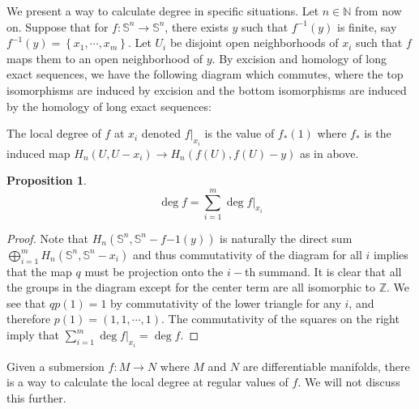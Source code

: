 \documentclass[12pt,reqno]{amsart}
\numberwithin{theorem}{section}
\theoremstyle{definition}
\theoremstyle{remark}
\numberwithin{equation}{section}
\newcommand{\Z}{\mathbb Z}
\newcommand{\N}{\mathbb N}
\renewcommand{\S}{\mathbb S}
\newcommand{\set}[1]{\left \{ #1 \right \}}
\theoremstyle{definition}
\newtheorem{prop}[theorem]{Proposition}
\begin{document}
We present a way to calculate degree in specific situations. Let $n \in \N$ from now on. Suppose that for $f:\S^n\rightarrow \S^n$, there exists $y $ such that $f^{-1}(y)$ is finite, say $f^{-1}(y)=\set{x_1,\cdots,x_m}$. Let $U_i$ be disjoint open neighborhoods of $x_i$ such that $f$ maps them to an open neighborhood of $y$. By excision and homology of long exact sequences, we have the following diagram which commutes, where the top isomorphisms are induced by excision and the bottom isomorphisms are induced by the homology of long exact sequences:
\begin{center}
\end{center}
\begin{definition}
    The local degree of $f$ at $x_i$ denoted $f|_{x_i} $ is the value of $f_*(1)$ where $f_*$ is the induced map $H_n(U,U-x_i)\rightarrow H_n(f(U),f(U)-y)$ as in above.
\end{definition}
\begin{prop}
    $$\deg f = \sum_{i=1}^m \deg f|_{x_i}$$
\end{prop}
\begin{proof}
    Note that $H_n(\S^n,\S^n-f{-1}(y))$ is naturally the direct sum $\bigoplus_{i=1}^m H_n(\S^n,\S^n-x_i)$ and thus commutativity of the diagram for all $i$ implies that the map $q$ must be projection onto the $i-$th summand. It is clear that all the groups in the diagram except for the center term are all isomorphic to $\Z$. We see that $qp(1) = 1$ by commutativity of the lower triangle for any $i$, and therefore $p(1) = (1,1,\cdots,1)$. The commutativity of the squares on the right imply that $\sum_{i=1}^m\deg f|_{x_i} = \deg f$.
\end{proof}
\begin{remark}
    Given a submersion $f:M \rightarrow N$ where $M$ and $N$ are differentiable manifolds, there is a way to calculate the local degree at regular values of $f$. We will not discuss this further.
\end{remark}
\end{document}
